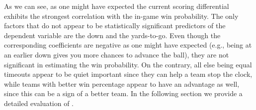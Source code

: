 As we can see, as one might have expected the current scoring differential exhibits the strongest correlation with the in-game win probability.  
The only factors that do not appear to be statistically significant predictors of the dependent variable are the down and the yards-to-go. 
Even though the corresponding coefficients are negative as one might have expected (e.g., being at an earlier down gives you more chances to advance the ball), they are not significant in estimating the win probability. 
On the contrary, all else being equal timeouts appear to be quiet important since they can help a team stop the clock, while teams with better win percentage appear to have an advantage as well, since this can be a sign of a better team. 
In the following section we provide a detailed evaluation of {\method}.